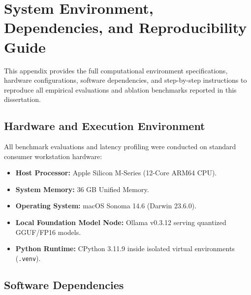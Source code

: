 \chapter{System Environment, Dependencies, and Reproducibility Guide}
\label{app:reproducibility}

This appendix provides the full computational environment specifications, hardware configurations, software dependencies, and step-by-step instructions to reproduce all empirical evaluations and ablation benchmarks reported in this dissertation.

\section{Hardware and Execution Environment}
\label{sec:app_hardware_env}

All benchmark evaluations and latency profiling were conducted on standard consumer workstation hardware:
\begin{itemize}
    \item \textbf{Host Processor:} Apple Silicon M-Series (12-Core ARM64 CPU).
    \item \textbf{System Memory:} 36 GB Unified Memory.
    \item \textbf{Operating System:} macOS Sonoma 14.6 (Darwin 23.6.0).
    \item \textbf{Local Foundation Model Node:} Ollama v0.3.12 serving quantized GGUF/FP16 models.
    \item \textbf{Python Runtime:} CPython 3.11.9 inside isolated virtual environments (\texttt{.venv}).
\end{itemize}

\section{Software Dependencies}
\label{sec:app_software_deps}

